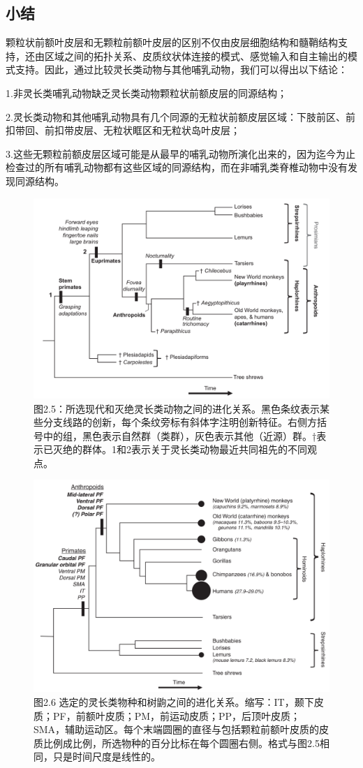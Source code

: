 \subsection{小结}
颗粒状前额叶皮层和无颗粒前额叶皮层的区别不仅由皮层细胞结构和髓鞘结构支持，还由区域之间的拓扑关系、皮质纹状体连接的模式、感觉输入和自主输出的模式支持。因此，通过比较灵长类动物与其他哺乳动物，我们可以得出以下结论：\par
1.非灵长类哺乳动物缺乏灵长类动物颗粒状前额皮层的同源结构；\par
2.灵长类动物和其他哺乳动物具有几个同源的无粒状前额皮层区域：下肢前区、前扣带回、前扣带皮层、无粒状眶区和无粒状岛叶皮层；\par
3.这些无颗粒前额皮层区域可能是从最早的哺乳动物所演化出来的，因为迄今为止检查过的所有哺乳动物都有这些区域的同源结构，而在非哺乳类脊椎动物中没有发现同源结构。

\begin{figure}[!htb]
	\centering
	\includegraphics[width=0.8\linewidth]{image_pfc/Fig_2_5}
	\caption*{图2.5：所选现代和灭绝灵长类动物之间的进化关系。黑色条纹表示某些分支线路的创新，每个条纹旁标有斜体字注明创新特征。右侧方括号中的组，黑色表示自然群（类群），灰色表示其他（近源）群。†表示已灭绝的群体。1和2表示关于灵长类动物最近共同祖先的不同观点。}
\end{figure}

\begin{figure}[!htb]
	\centering
	\includegraphics[width=0.8\linewidth]{image_pfc/Fig_2_6}
	\caption*{图2.6 选定的灵长类物种和树鼩之间的进化关系。缩写：IT，颞下皮质；PF，前额叶皮质；PM，前运动皮质；PP，后顶叶皮质；SMA，辅助运动区。每个末端圆圈的直径与包括颗粒前额叶皮质的皮质比例成比例，所选物种的百分比标在每个圆圈右侧。格式与图2.5相同，只是时间尺度是线性的。}
\end{figure}


